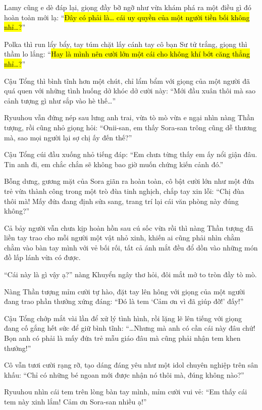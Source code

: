 \documentclass[../main.tex]{subfiles}
\begin{document}
Lamy cũng e dè đáp lại, giọng đầy bỡ ngỡ như vừa khám phá ra một điều gì đó hoàn toàn mới lạ: ``\hl{Đây có phải là\dots{} cái uy quyền của một người tiền bối không nhỉ\dots?}''

Polka thì run lẩy bẩy, tay túm chặt lấy cánh tay cô bạn Sư tử trắng, giọng thì thầm lo lắng: ``\hl{Hay là mình nên cười lớn một cái cho không khí bớt căng thẳng nhỉ\dots?}''

Cậu Tổng thì bình tĩnh hơn một chút, chỉ lẩm bẩm với giọng của một người đã quá quen với những tình huống dở khóc dở cười này: ``Mới đầu xuân thôi mà sao cảnh tượng gì như sắp vào hè thế\dots''

Ryuuhou vẫn đứng nép sau lưng anh trai, vừa tò mò vừa e ngại nhìn nàng Thần tượng, rồi cũng nhỏ giọng hỏi: ``Onii-san, em thấy Sora-san trông cũng dễ thương mà, sao mọi người lại sợ chị ấy đến thế?''

Cậu Tổng cúi đầu xuống nhỏ tiếng đáp: ``Em chưa từng thấy em ấy nổi giận đâu. Tin anh đi, em chắc chắn sẽ không bao giờ muốn chứng kiến cảnh đó.''

Bỗng dưng, gương mặt của Sora giãn ra hoàn toàn, cô bật cười lớn như một đứa trẻ vừa thành công trong một trò đùa tinh nghịch, chắp tay xin lỗi: ``Chị đùa thôi mà! Mấy đứa đang định sửa sang, trang trí lại cái văn phòng này đúng không?''

Cả bảy người vẫn chưa kịp hoàn hồn sau cú sốc vừa rồi thì nàng Thần tượng đã liền tay trao cho mỗi người một vật nhỏ xinh, khiến ai cũng phải nhìn chằm chằm vào bàn tay mình với vẻ bối rối, tất cả ánh mắt đều đổ dồn vào những món đồ lấp lánh vừa có được.


``Cái này là gì vậy ạ?'' nàng Khuyển ngây thơ hỏi, đôi mắt mở to tròn đầy tò mò.

Nàng Thần tượng mỉm cười tự hào, đặt tay lên hông với giọng của một người đang trao phần thưởng xứng đáng: ``Đó là tem `Cảm ơn vì đã giúp đỡ!' đấy!''

Cậu Tổng chớp mắt vài lần để xử lý tình hình, rồi lặng lẽ lên tiếng với giọng đang cố gắng hết sức để giữ bình tĩnh: ``\dots Nhưng mà anh có cần cái này đâu chứ! Bọn anh có phải là mấy đứa trẻ mẫu giáo đâu mà cũng phải nhận tem khen thưởng!''

Cô vẫn tươi cười rạng rỡ, tạo dáng đáng yêu như một idol chuyên nghiệp trên sân khấu: ``Chỉ có những bé ngoan mới được nhận nó thôi mà, đúng không nào?''

Ryuuhou nhìn cái tem trên lòng bàn tay mình, mỉm cười vui vẻ: ``Em thấy cái tem này xinh lắm! Cảm ơn Sora-san nhiều ạ!''
\end{document}
